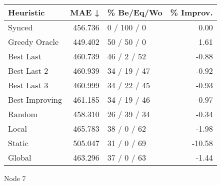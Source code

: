 \begin{tabular}{lrlr}
\toprule
\textbf{Heuristic} & \textbf{MAE ↓} & \textbf{\% Be/Eq/Wo} & \textbf{\% Improv.} \\
\midrule
            Synced &        456.736 &          0 / 100 / 0 &                0.00 \\
     Greedy Oracle &        449.402 &          50 / 50 / 0 &                1.61 \\
         Best Last &        460.739 &          46 / 2 / 52 &               -0.88 \\
       Best Last 2 &        460.939 &         34 / 19 / 47 &               -0.92 \\
       Best Last 3 &        460.999 &         34 / 22 / 45 &               -0.93 \\
    Best Improving &        461.185 &         34 / 19 / 46 &               -0.97 \\
            Random &        458.310 &         26 / 39 / 34 &               -0.34 \\
             Local &        465.783 &          38 / 0 / 62 &               -1.98 \\
            Static &        505.047 &          31 / 0 / 69 &              -10.58 \\
            Global &        463.296 &          37 / 0 / 63 &               -1.44 \\
\bottomrule
\end{tabular}
\caption{Node 7}
\label{tab:non_lr05_le2_bs2_7}
